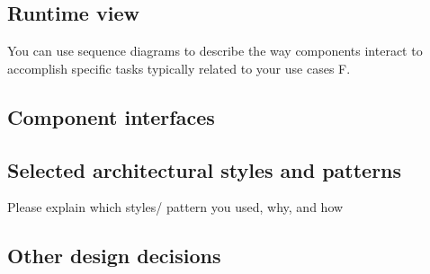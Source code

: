 \subsection{Runtime view}
You can use sequence diagrams to describe the way components interact to accomplish specific tasks typically related to your use cases F. 
\subsection{Component interfaces} 
\subsection{Selected architectural styles and patterns}
Please explain which styles/ pattern you used, why, and how
\subsection{Other design decisions }